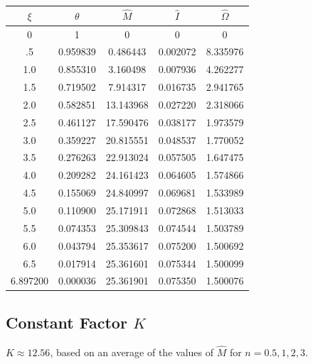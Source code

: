 \documentclass[11pt]{article} %
\begin{document}
\begin{tabular}{| c | c c c c |}
\hline
$\xi$ & $\theta$ & $\hat{M}$ &  $\hat{I}$  & $\hat{\Omega}$ \\
\hline
0 & 1 & 0 & 0 & 0 \\
.5 & 0.959839 & 0.486443 & 0.002072 &8.335976\\
1.0 & 0.855310 & 3.160498 &0.007936 & 4.262277\\
1.5 & 0.719502 & 7.914317 & 0.016735 & 2.941765\\
2.0 &0.582851 &13.143968 &0.027220 & 2.318066\\
2.5 & 0.461127 & 17.590476 &0.038177 & 1.973579\\
3.0 & 0.359227 &20.815551 & 0.048537 & 1.770052\\
3.5 & 0.276263 &22.913024 & 0.057505 & 1.647475\\
4.0 &0.209282 &24.161423 &0.064605 & 1.574866\\
4.5 &0.155069 &24.840997 &0.069681 & 1.533989\\
5.0 & 0.110900 & 25.171911  &0.072868&1.513033\\
5.5 & 0.074353 & 25.309843  &0.074544 &1.503789\\
6.0 &0.043794 &25.353617 &0.075200 & 1.500692\\
6.5 & 0.017914 &25.361601 &0.075344 & 1.500099\\
6.897200 & 0.000036 & 25.361901 & 0.075350 & 1.500076\\
\hline
\end{tabular}


\subsection*{Constant Factor $K$}
$K \approx 12.56$, based on an average of the values of $\hat M$ for $n = 0.5, 1, 2, 3$.
\end{document}
